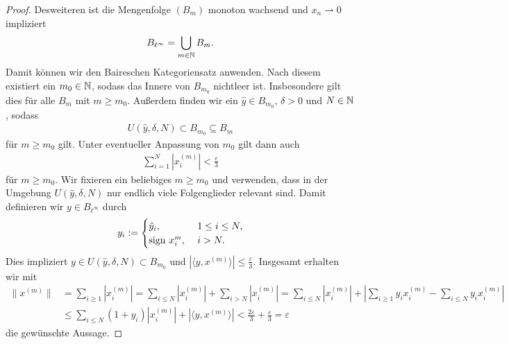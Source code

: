 \begin{proof}
	Desweiteren ist die Mengenfolge $ (B_m) $ monoton wachsend
	und $ x_n \rightharpoonup 0 $ impliziert
	\begin{align*}
		B_{\ell^\infty }
		=
		\bigcup \limits_{m \in \mathbb{N}} B_m.
	\end{align*}
	Damit können wir den Baireschen Kategoriensatz anwenden.
	Nach diesem existiert ein $ m_0 \in \mathbb{N} $, sodass das Innere von $ B_{m_0} $ nichtleer ist. Insbesondere gilt dies für alle $ B_m $ mit $ m \geq m_0 $.
	Außerdem finden wir ein $ \hat{y} \in B_{m_0} $, $ \delta > 0 $ und $ N \in \mathbb{N} $, sodass
	\begin{align*}
		U(\hat{y}, \delta , N)
		\subset B_{m_0} \subseteq B_m
	\end{align*}
	für $ m \geq m_0 $ gilt. Unter eventueller Anpassung von $ m_0 $ gilt dann auch
	\begin{align*}
		\sum \limits_{i =1}^N | x^{(m)}_i | < \frac{\varepsilon}{3}
	\end{align*}
	für $ m \geq m_0 $.
	Wir fixieren ein beliebiges $ m \geq m_0 $ und verwenden, dass in der Umgebung $ U(\hat{y},\delta, N) $ nur endlich viele Folgenglieder relevant sind. Damit definieren wir $ y \in B_{\ell^\infty} $ durch
	\begin{align*}
		y_i
		:=
		\begin{cases}
			\hat{y}_i , &\ 1 \leq i \leq N,\\
			\mathrm{sign} \  x^{m}_i , &\ i > N.
		\end{cases}
	\end{align*}
	Dies impliziert $ y \in U(\hat{y},\delta, N) \subset B_{m_0}  $
	und $ | \langle y ,x^{(m)} \rangle  | \leq \frac{\varepsilon}{3}$.
	Insgesamt erhalten wir mit
	\begin{align*}
		\| x^{(m)} \|
		&=
		\sum \limits_{i \geq 1} |x_i^{(m)}|
		=
		\sum \limits_{i \leq N} |x_i^{(m)}|
		+
		\sum \limits_{i > N} |x_i^{(m)}|
		=
		\sum \limits_{i \leq N} |x_i^{(m)}|
		+
		\left|
		\sum \limits_{i \geq 1} y_i x_i^{(m)}
		-
		\sum \limits_{i \leq N} y_i x_i^{(m)}
		\right|\\
		&\leq
		\sum \limits_{i \leq N} (1+ y_i)|x_i^{(m)}|
		+ | \langle y, x^{(m )} \rangle | 
		<
		\frac{2 \varepsilon}{3} + \frac{\varepsilon}{3}
		= \varepsilon
	\end{align*}
	die gewünschte Aussage.
	


	
\end{proof}

